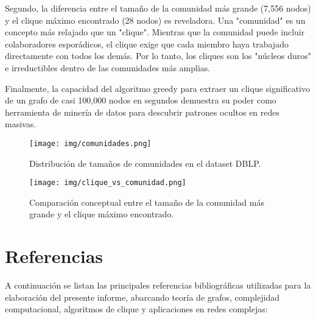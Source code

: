 \documentclass[12pt,a4paper]{report}
\begin{document}
Segundo, la diferencia entre el tamaño de la comunidad más grande (7,556 nodos) y el clique máximo encontrado (28 nodos) es reveladora. Una "comunidad" es un concepto más relajado que un "clique". Mientras que la comunidad puede incluir colaboradores esporádicos, el clique exige que cada miembro haya trabajado directamente con todos los demás. Por lo tanto, los cliques son los "núcleos duros" e irreductibles dentro de las comunidades más amplias.

Finalmente, la capacidad del algoritmo greedy para extraer un clique significativo de un grafo de casi 100,000 nodos en segundos demuestra su poder como herramienta de minería de datos para descubrir patrones ocultos en redes masivas.

\begin{figure}[H]
    \centering
    \texttt{[image: img/comunidades.png]}
    \caption{Distribución de tamaños de comunidades en el dataset DBLP.}
    \label{fig:distribucion_comunidades}
\end{figure}

\begin{figure}[H]
    \centering
    \texttt{[image: img/clique\_vs\_comunidad.png]}
    \caption{Comparación conceptual entre el tamaño de la comunidad más grande y el clique máximo encontrado.}
    \label{fig:clique_vs_comunidad}
\end{figure}

\newpage

\chapter{Referencias}

A continuación se listan las principales referencias bibliográficas utilizadas para la elaboración del presente informe, abarcando teoría de grafos, complejidad computacional, algoritmos de clique y aplicaciones en redes complejas:
\end{document}
